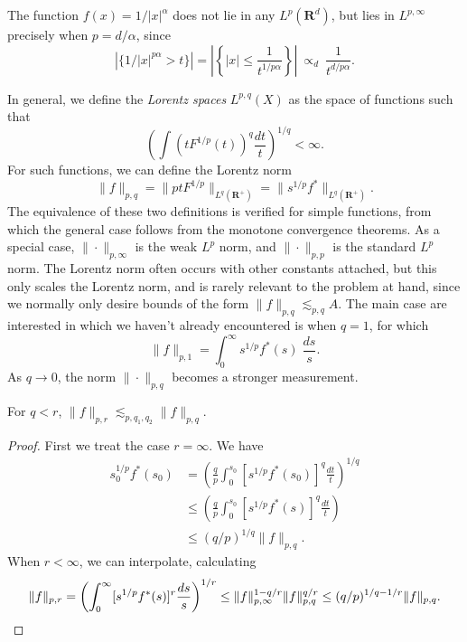\begin{example}
    The function $f(x) = 1/|x|^\alpha$ does not lie in any $L^p(\mathbf{R}^d)$, but lies in $L^{p,\infty}$ precisely when $p = d/\alpha$, since
    \[ \left| \{ 1/|x|^{p\alpha} > t \} \right| = \left| \left\{ |x| \leq \frac{1}{t^{1/p\alpha}} \right\} \right|\ \propto_d\ \frac{1}{t^{d/p\alpha}}. \]
\end{example}

In general, we define the \emph{Lorentz spaces} $L^{p,q}(X)$ as the space of functions such that
%
\[ \left( \int (t F^{1/p}(t))^q \frac{dt}{t} \right)^{1/q} < \infty. \]
%
For such functions, we can define the Lorentz norm
%
\[ \| f \|_{p,q} = \| p t F^{1/p} \|_{L^q(\mathbf{R}^+)} = \| s^{1/p} f^* \|_{L^q(\mathbf{R}^+)}. \]
%
The equivalence of these two definitions is verified for simple functions, from which the general case follows from the monotone convergence theorems. As a special case, $\| \cdot \|_{p,\infty}$ is the weak $L^p$ norm, and $\| \cdot \|_{p,p}$ is the standard $L^p$ norm. The Lorentz norm often occurs with other constants attached, but this only scales the Lorentz norm, and is rarely relevant to the problem at hand, since we normally only desire bounds of the form $\| f \|_{p,q} \lesssim_{p,q} A$. The main case are interested in which we haven't already encountered is when $q = 1$, for which
%
\[ \| f \|_{p,1} = \int_0^\infty s^{1/p} f^*(s)\; \frac{ds}{s}. \]
%
As $q \to 0$, the norm $\| \cdot \|_{p,q}$ becomes a stronger measurement.

\begin{theorem}
    For $q < r$, $\| f \|_{p,r} \lesssim_{p,q_1,q_2} \| f \|_{p,q}$.
\end{theorem}
\begin{proof}
    First we treat the case $r = \infty$. We have
    \begin{align*}
        s_0^{1/p} f^*(s_0) &= \left( \frac{q}{p} \int_0^{s_0} [s^{1/p} f^*(s_0)]^q \frac{dt}{t} \right)^{1/q}\\
        &\leq \left( \frac{q}{p} \int_0^{s_0} [s^{1/p} f^*(s)]^q \frac{dt}{t} \right)\\
        &\leq (q/p)^{1/q} \| f \|_{p,q}.
    \end{align*}
    When $r < \infty$, we can interpolate, calculating
    \[ \| f \|_{p,r} = \left( \int_0^\infty [s^{1/p} f^*(s)]^r \frac{ds}{s} \right)^{1/r} \leq \| f \|_{p,\infty}^{1 - q/r} \| f \|_{p,q}^{q/r} \leq (q/p)^{1/q - 1/r} \| f \|_{p,q}. \qedhere \]
\end{proof}

